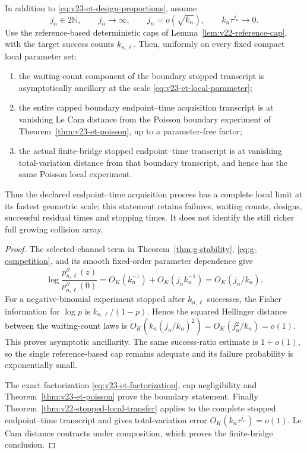 \begin{theorem}
\label{thm:v23-complete-et}
In addition to \eqref{eq:v23-et-design-proportions}, assume
\begin{equation}\label{eq:v23-et-flight-conditions}
 j_n\in2\mathbb N,\qquad j_n\to\infty,\qquad
 j_n=o(\sqrt{k_n}),\qquad k_n\tau^{j_n}\to0.
\end{equation}
Use the reference-based deterministic caps of
Lemma~\ref{lem:v22-reference-cap}, with the target success counts
\(k_{n,\ell}\).  Then, uniformly on every fixed compact local parameter set:
\begin{enumerate}
\item the waiting-count component of the boundary stopped transcript is
asymptotically ancillary at the scale \eqref{eq:v23-et-local-parameter};
\item the entire capped boundary endpoint--time acquisition transcript is at
vanishing Le Cam distance from the Poisson boundary experiment of
Theorem~\ref{thm:v23-et-poisson}, up to a parameter-free factor;
\item the actual finite-bridge stopped endpoint--time transcript is at
vanishing total-variation distance from that boundary transcript, and hence
has the same Poisson local experiment.
\end{enumerate}
Thus the declared endpoint--time acquisition process has a complete local
limit at its fastest geometric scale; this statement retains failures,
waiting counts, designs, successful residual times and stopping times.  It
does not identify the still richer full growing collision array.
\end{theorem}

\begin{proof}
The selected-channel term in Theorem~\ref{thm:g-stability},
\eqref{eq:g-competition}, and its smooth fixed-order parameter dependence give
\[
 \log\frac{p^\partial_{n,\ell}(z)}
          {p^\partial_{n,\ell}(0)}
 =O_K(k_n^{-1})+O_K(j_nk_n^{-1})
 =O_K(j_n/k_n).
\]
For a negative-binomial experiment stopped after \(k_{n,\ell}\) successes,
the Fisher information for \(\log p\) is
\(k_{n,\ell}/(1-p)\).  Hence the squared Hellinger distance between the
waiting-count laws is
\(O_K(k_n(j_n/k_n)^2)=O_K(j_n^2/k_n)=o(1)\).
This proves asymptotic ancillarity.  The same success-ratio estimate is
\(1+o(1)\), so the single reference-based cap remains adequate and its failure
probability is exponentially small.

The exact factorization \eqref{eq:v23-et-factorization}, cap negligibility and
Theorem~\ref{thm:v23-et-poisson} prove the boundary statement.  Finally
Theorem~\ref{thm:v22-stopped-local-transfer} applies to the complete stopped
endpoint--time transcript and gives total-variation error
\(O_K(k_n\tau^{j_n})\)\(=o(1)\).  Le Cam distance contracts under composition,
which proves the finite-bridge conclusion.
\end{proof}

